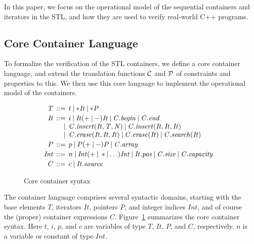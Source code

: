 \documentclass[conference]{IEEEtran}
\begin{document}
In this paper, we focus on the operational model of the
sequential containers and iterators in the STL,
and how they are used to
verify real-world C++ programs.



\subsection{Core Container Language}

To formalize the verification of the STL containers,
we define a core container language, and extend the translation
functions $\cal C$ and  $\cal P$ of constraints and properties to this.
We then use this core language to implement the operational model
of the containers.

\begin{figure}
\[\begin{array}{r@{\:\:}r@{\:\:}l}
  T   & ::= &
    t \:|\: \mathit{*It} \:|\: \mathit{*P}
\\[0.5ex]
   \mathit{It} & ::= &
     i \:|\: \mathit{It} (+ \:|\: -) \mathit{It}
       \:|\: \mathit{C.begin} \:|\: \mathit{C.end}
\\  & | &
     \mathit{C.insert(It, T, N)} \:|\: \mathit{C.insert(It, It, It)}
\\  & | &
     \mathit{C.erase(It, It, It)} \:|\: \mathit{C.erase(It)} \:|\: \mathit{C.search(It)}
\\[0.5ex]
   P  & ::= &
     p \:|\: P (+ \:|\: - ) P
       \:|\: \mathit{C.array}
\\[0.5ex]
  \mathit{Int}  & ::= &
     n \:|\: \mathit{Int} (+ \:|\: * | \ldots) \mathit{Int}
       \:|\: \mathit{It.pos}
       \:|\: \mathit{C.size} \: | \: \mathit{C.capacity}
\\[0.5ex]
   C  & ::= &
     c \:|\: \mathit{It.source}
  \end{array}
\]
  \caption{\label{ccl-fig}Core container syntax}
\end{figure}

The container language comprises several syntactic domains, starting with the
base elements $\mathit{T}$, iterators $\mathit{It}$, pointers $\mathit{P}$, and
integer indices $\mathit{Int}$, and of course the (proper) container
expressions $\mathit{C}$.  Figure~\ref{ccl-fig} summarizes the core container
syntax. Here $t$, $i$, $p$, and $c$ are variables of type $T$, $\mathit{It}$,
$P$, and $C$, respectively.  $n$ is a variable or constant of type
$\mathit{Int}$.
\end{document}
